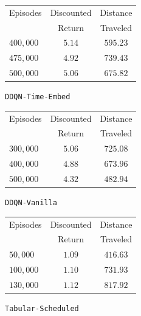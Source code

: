 \begin{figure}[H]
    \centering

    \begin{minipage}{0.32\linewidth}
        \centering
        \begin{tabular}{lcc}
            \hline
            Episodes & Discounted & Distance \\
             & Return & Traveled \\
            \hline
            $400,000$ & $5.14$ & $595.23$ \\
            $475,000$ & $4.92$ & $739.43$ \\
            $500,000$ & $5.06$ & $675.82$ \\
            \hline
        \end{tabular}
        \caption{\texttt{DDQN-Time-Embed}}
    \end{minipage}
    \hfill
    \begin{minipage}{0.32\linewidth}
        \centering
        \begin{tabular}{lcc}
            \hline
            Episodes & Discounted & Distance \\
             & Return & Traveled \\
            
            \hline
            $300,000$ & $5.06$ & $725.08$ \\
            $400,000$ & $4.88$ & $673.96$ \\
            $500,000$ & $4.32$ & $482.94$ \\
            \hline
        \end{tabular}
        \caption{\texttt{DDQN-Vanilla}}
    \end{minipage}
    \hfill
    \begin{minipage}{0.32\linewidth}
        \centering
        \begin{tabular}{lcc}
            \hline
            Episodes & Discounted & Distance \\
             & Return & Traveled \\
            \hline
            $50,000$ & $1.09$ & $416.63$ \\
            $100,000$ & $1.10$ & $731.93$ \\
            $130,000$ & $1.12$ & $817.92$ \\
            \hline
        \end{tabular}
        \caption{\texttt{Tabular-Scheduled}}
    \end{minipage}
    \label{fig:part3-time}
\end{figure}

